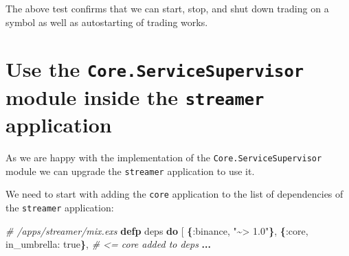 \documentclass[
  oneside]{book}
\newenvironment{Shaded}{\begin{snugshade}}{\end{snugshade}}
\newcommand{\AttributeTok}[1]{\textcolor[rgb]{0.13,0.29,0.53}{#1}}
\newcommand{\CommentTok}[1]{\textcolor[rgb]{0.56,0.35,0.01}{\textit{#1}}}
\newcommand{\ConstantTok}[1]{\textcolor[rgb]{0.56,0.35,0.01}{#1}}
\newcommand{\ControlFlowTok}[1]{\textcolor[rgb]{0.13,0.29,0.53}{\textbf{#1}}}
\newcommand{\ErrorTok}[1]{\textcolor[rgb]{0.64,0.00,0.00}{\textbf{#1}}}
\newcommand{\ExtensionTok}[1]{#1}
\newcommand{\FunctionTok}[1]{\textcolor[rgb]{0.13,0.29,0.53}{\textbf{#1}}}
\newcommand{\KeywordTok}[1]{\textcolor[rgb]{0.13,0.29,0.53}{\textbf{#1}}}
\newcommand{\NormalTok}[1]{#1}
\newcommand{\OperatorTok}[1]{\textcolor[rgb]{0.81,0.36,0.00}{\textbf{#1}}}
\newcommand{\OtherTok}[1]{\textcolor[rgb]{0.56,0.35,0.01}{#1}}
\newcommand{\PreprocessorTok}[1]{\textcolor[rgb]{0.56,0.35,0.01}{\textit{#1}}}
\newcommand{\SpecialStringTok}[1]{\textcolor[rgb]{0.31,0.60,0.02}{#1}}
\newcommand{\StringTok}[1]{\textcolor[rgb]{0.31,0.60,0.02}{#1}}
\newcommand{\VariableTok}[1]{\textcolor[rgb]{0.00,0.00,0.00}{#1}}
\begin{document}
\begin{Shaded}
\end{Shaded}

The above test confirms that we can start, stop, and shut down trading on a symbol as well as autostarting of trading works.

\section{\texorpdfstring{Use the \texttt{Core.ServiceSupervisor} module inside the \texttt{streamer} application}{Use the Core.ServiceSupervisor module inside the streamer application}}\label{use-the-core.servicesupervisor-module-inside-the-streamer-application}

As we are happy with the implementation of the \texttt{Core.ServiceSupervisor} module we can upgrade the \texttt{streamer} application to use it.

We need to start with adding the \texttt{core} application to the list of dependencies of the \texttt{streamer} application:

\begin{Shaded}
\begin{Highlighting}[]
\CommentTok{\# /apps/streamer/mix.exs}
  \KeywordTok{defp}\NormalTok{ deps }\KeywordTok{do}
    \OtherTok{[}
      \FunctionTok{\{}\VariableTok{:binance}\NormalTok{, }\StringTok{"\textasciitilde{}\textgreater{} 1.0"}\FunctionTok{\}}\NormalTok{,}
      \FunctionTok{\{}\VariableTok{:core}\NormalTok{, }\VariableTok{in\_umbrella:} \ConstantTok{true}\FunctionTok{\}}\NormalTok{, }\CommentTok{\# \textless{}= core added to deps}
      \OperatorTok{...}
\end{Highlighting}
\end{Shaded}
\end{document}
